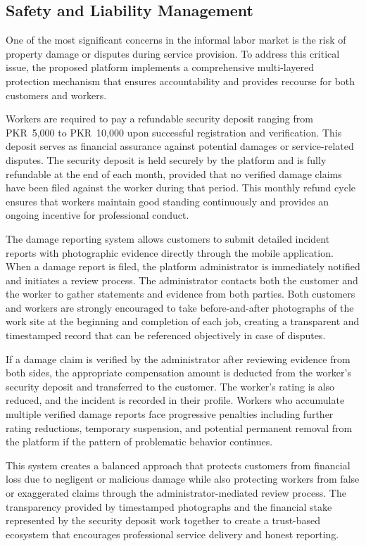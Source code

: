 \documentclass[12pt,a4paper]{report}
\begin{document}
\subsection{Safety and Liability Management}

One of the most significant concerns in the informal labor market is the risk of
property damage or disputes during service provision. To address this critical
issue, the proposed platform implements a comprehensive multi-layered protection
mechanism that ensures accountability and provides recourse for both customers
and workers.

Workers are required to pay a refundable security deposit ranging from
PKR~5,000 to PKR~10,000 upon successful registration and verification. This
deposit serves as financial assurance against potential damages or
service-related disputes. The security deposit is held securely by the platform
and is fully refundable at the end of each month, provided that no verified
damage claims have been filed against the worker during that period. This monthly
refund cycle ensures that workers maintain good standing continuously and
provides an ongoing incentive for professional conduct.

The damage reporting system allows customers to submit detailed incident reports
with photographic evidence directly through the mobile application. When a
damage report is filed, the platform administrator is immediately notified and
initiates a review process. The administrator contacts both the customer and the
worker to gather statements and evidence from both parties. Both customers and
workers are strongly encouraged to take before-and-after photographs of the work
site at the beginning and completion of each job, creating a transparent and
timestamped record that can be referenced objectively in case of disputes.

If a damage claim is verified by the administrator after reviewing evidence from
both sides, the appropriate compensation amount is deducted from the worker's
security deposit and transferred to the customer. The worker's rating is also
reduced, and the incident is recorded in their profile. Workers who accumulate
multiple verified damage reports face progressive penalties including further
rating reductions, temporary suspension, and potential permanent removal from
the platform if the pattern of problematic behavior continues.

This system creates a balanced approach that protects customers from financial
loss due to negligent or malicious damage while also protecting workers from
false or exaggerated claims through the administrator-mediated review process.
The transparency provided by timestamped photographs and the financial stake
represented by the security deposit work together to create a trust-based
ecosystem that encourages professional service delivery and honest reporting.
\end{document}
